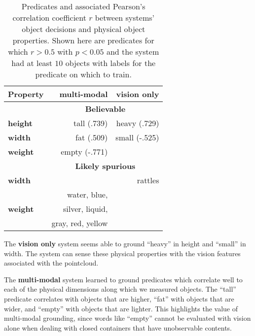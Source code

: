 \begin{table}
\centering
\begin{tabular}[h]{|l|r|r|}
	\hline
	\bf Property & \bf multi-modal & \bf vision only \\ \hline \hline
	& \multicolumn{2}{c|}{\bf Believable} \\ \hline
	\bf height & tall (.739) & heavy (.729) \\ \hline
	\bf width & fat (.509) & small (-.525) \\ \hline
	\bf weight & empty (-.771) & \\ \hline \hline
	& \multicolumn{2}{c|}{\bf Likely spurious} \\ \hline
	\bf width & & rattles \\ \hline
	& water, blue, & \\
	\bf weight & silver, liquid, & \\ 
	& gray, red, yellow & \\ \hline
\end{tabular}
\caption{Predicates and associated Pearson's correlation coefficient $r$ between systems' object decisions and physical object properties.
Shown here are predicates for which $r>0.5$ with $p<0.05$ and the system had at least $10$ objects with labels for the predicate on which to train.}
\label{tab:predicate_correlations}
\end{table}

The \textbf{vision only} system seems able to ground ``heavy'' in height and ``small'' in width.
The system can sense these physical properties with the vision features associated with the pointcloud.

The \textbf{multi-modal} system learned to ground predicates which correlate well to each of the physical dimensions along which we measured objects.
The ``tall'' predicate correlates with objects that are higher, ``fat'' with objects that are wider, and ``empty'' with objects that are lighter.
This highlights the value of multi-modal grounding, since words like ``empty'' cannot be evaluated with vision alone when dealing with closed containers that have unobservable contents.
